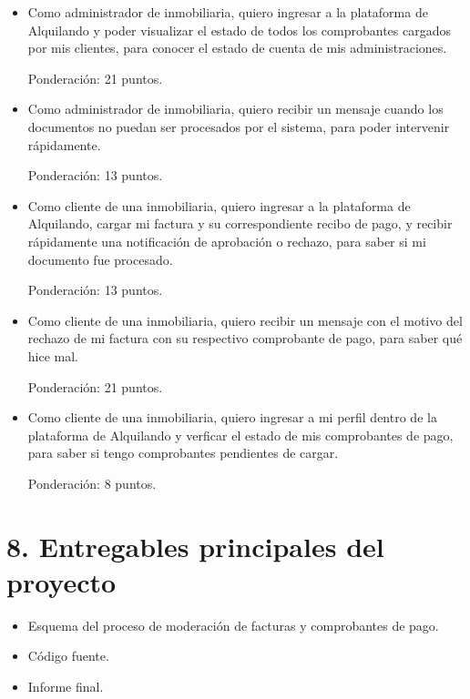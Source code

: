 \documentclass[
11pt, %
]{charter}
\begin{document}
\begin{•}
\begin{itemize}
	Ponderación: 21 puntos.
	
	\item Como administrador de inmobiliaria, quiero ingresar a la plataforma de Alquilando y poder visualizar el estado de todos los comprobantes cargados por mis clientes, para conocer el estado de cuenta de mis administraciones.
	
	Ponderación: 21 puntos.
	
	\item Como administrador de inmobiliaria, quiero recibir un mensaje cuando los documentos no puedan ser procesados por el sistema, para poder intervenir rápidamente.
	
	Ponderación: 13 puntos.
	
	\item Como cliente de una inmobiliaria, quiero ingresar a la plataforma de Alquilando, cargar mi factura y su correspondiente recibo de pago, y recibir rápidamente una notificación de aprobación o rechazo, para saber si mi documento fue procesado.
	
	Ponderación: 13 puntos.
	
	\item Como cliente de una inmobiliaria, quiero recibir un mensaje con el motivo del rechazo de mi factura con su respectivo comprobante de pago, para saber qué hice mal.
	
	Ponderación: 21 puntos.
	
	\item Como cliente de una inmobiliaria, quiero ingresar a mi perfil dentro de la plataforma de Alquilando y verficar el estado de mis comprobantes de pago, para saber si tengo comprobantes pendientes de cargar.
	
	Ponderación: 8 puntos.
	
\end{itemize}



\section{8. Entregables principales del proyecto}
\label{sec:entregables}

\begin{itemize}
	\item Esquema del proceso de moderación de facturas y comprobantes de pago.
	\item Código fuente.
	\item Informe final.
\end{itemize}



\end{•}
\end{document}
